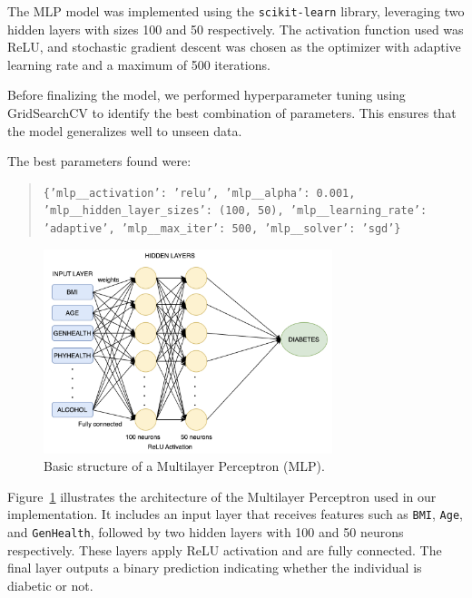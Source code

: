 The MLP model was implemented using the \texttt{scikit-learn} library, leveraging two hidden layers with sizes 100 and 50 respectively. The activation function used was ReLU, and stochastic gradient descent was chosen as the optimizer with adaptive learning rate and a maximum of 500 iterations.

Before finalizing the model, we performed hyperparameter tuning using GridSearchCV to identify the best combination of parameters. This ensures that the model generalizes well to unseen data.

\noindent
The best parameters found were:
\begin{quote}
\texttt{\{'mlp\_\_activation': 'relu', 'mlp\_\_alpha': 0.001, 'mlp\_\_hidden\_layer\_sizes': (100, 50), 'mlp\_\_learning\_rate': 'adaptive', 'mlp\_\_max\_iter': 500, 'mlp\_\_solver': 'sgd'\}}
\end{quote}



\begin{figure}[H]
    \centering
    \includegraphics[width=0.75\textwidth]{images/our-mlp-diagram.png} %
    \caption{Basic structure of a Multilayer Perceptron (MLP).}
    \label{fig:mlp-arch}
\end{figure}

\vspace{0.5em}

\noindent
Figure~\ref{fig:mlp-arch} illustrates the architecture of the Multilayer Perceptron used in our implementation. It includes an input layer that receives features such as \texttt{BMI}, \texttt{Age}, and \texttt{GenHealth}, followed by two hidden layers with 100 and 50 neurons respectively. These layers apply ReLU activation and are fully connected. The final layer outputs a binary prediction indicating whether the individual is diabetic or not.



